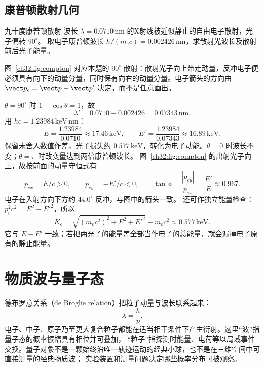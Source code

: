 \subsection{康普顿散射几何}

\begin{origexamplebox}{九十度康普顿散射}
波长 $\lambda=0.0710\,\mathrm{nm}$ 的X射线被近似静止的自由电子散射，光子偏转 $90^\circ$。
取电子康普顿波长 $h/(m_ec)=0.002426\,\mathrm{nm}$，求散射光波长及散射前后光子能量。
\end{origexamplebox}
\begin{xesolution}

\begin{center}

\label{ch32:fig:compton}
\end{center}
图~\ref{ch32:fig:compton} 对应本题的 $90^\circ$ 散射：散射光子向上带走动量，反冲电子便必须具有向下的动量分量，同时保有向右的动量分量。电子箭头的方向由 $\vect p_e=\vect p-\vect p'$ 决定，而不是任意画出。


$\theta=90^\circ$ 时 $1-\cos\theta=1$，故
\[
 \boxed{\lambda'=0.0710+0.002426=0.07343\,\mathrm{nm}}.
\]
用 $hc=1.23984\,\mathrm{keV\,nm}$：
\[
 E=\frac{1.23984}{0.0710}\approx17.46\,\mathrm{keV},
 \qquad
 E'=\frac{1.23984}{0.07343}\approx16.89\,\mathrm{keV}.
\]
保留未舍入数值作差，光子损失约 $0.577\,\mathrm{keV}$，转化为电子动能。$\theta=0$ 时波长不变；$\theta=\pi$ 时改变量达到两倍康普顿波长。
图~\ref{ch32:fig:compton} 的出射光子向上，故按前面的动量守恒式有
\[
 p_{ex}=E/c>0,\qquad p_{ey}=-E'/c<0,
 \qquad \tan\phi=\frac{|p_{ey}|}{p_{ex}}=\frac{E'}E\approx0.967.
\]
电子在入射方向下方约 $44.0^\circ$ 反冲，与图中的箭头一致。
还可作独立能量检查：$p_e^2c^2=E^2+E'^2$，所以
\[
 K_e=\sqrt{(m_ec^2)^2+E^2+E'^2}-m_ec^2\approx0.577\,\mathrm{keV}.
\]
它与 $E-E'$ 一致；若把两光子的能量差全部当作电子的总能量，就会漏掉电子原有的静止能量。
\end{xesolution}



\section{物质波与量子态}

德布罗意关系（de Broglie relation）把粒子动量与波长联系起来：
\begin{equation}
 \lambda=\frac hp.
\end{equation}
电子、中子、原子乃至更大复合粒子都能在适当相干条件下产生衍射。这里“波”指量子态的概率振幅具有相位并可叠加，
“粒子”指探测时能量、电荷等以局域事件交换。量子对象不是一颗始终沿唯一轨迹运动的经典小球，也不是在三维空间中可直接测量的经典物质波；
实验装置和测量问题决定哪些概率分布可被观察。

